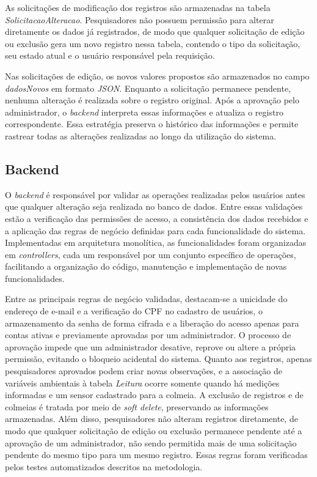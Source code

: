 \documentclass[12pt]{unisenaiclass}
\begin{document}
As solicitações de modificação dos registros são armazenadas na tabela \textit{SolicitacaoAlteracao}. Pesquisadores não possuem permissão para alterar diretamente os dados já registrados, de modo que qualquer solicitação de edição ou exclusão gera um novo registro nessa tabela, contendo o tipo da solicitação, seu estado atual e o usuário responsável pela requisição.

Nas solicitações de edição, os novos valores propostos são armazenados no campo \textit{dadosNovos} em formato \textit{JSON}. Enquanto a solicitação permanece pendente, nenhuma alteração é realizada sobre o registro original. Após a aprovação pelo administrador, o \textit{backend} interpreta essas informações e atualiza o registro correspondente. Essa estratégia preserva o histórico das informações e permite rastrear todas as alterações realizadas ao longo da utilização do sistema.

\subsection{Backend}

O \textit{backend} é responsável por validar as operações realizadas pelos usuários antes que qualquer alteração seja realizada no banco de dados. Entre essas validações estão a verificação das permissões de acesso, a consistência dos dados recebidos e a aplicação das regras de negócio definidas para cada funcionalidade do sistema. Implementadas em arquitetura monolítica, as funcionalidades foram organizadas em \textit{controllers}, cada um responsável por um conjunto específico de operações, facilitando a organização do código, manutenção e implementação de novas funcionalidades.

Entre as principais regras de negócio validadas, destacam-se a unicidade do endereço de e-mail e a verificação do CPF no cadastro de usuários, o armazenamento da senha de forma cifrada e a liberação do acesso apenas para contas ativas e previamente aprovadas por um administrador. 
O processo de aprovação impede que um administrador desative, reprove ou altere a própria permissão, evitando o bloqueio acidental do sistema. Quanto aos registros, apenas pesquisadores aprovados podem criar novas observações, e a associação de variáveis ambientais à tabela \textit{Leitura} ocorre somente quando há medições informadas e um sensor cadastrado para a colmeia. A exclusão de registros e de colmeias é tratada por meio de \textit{soft delete}, preservando as informações armazenadas. Além disso, pesquisadores não alteram registros diretamente, de modo que qualquer solicitação de edição ou exclusão permanece pendente até a aprovação de um administrador, não sendo permitida mais de uma solicitação pendente do mesmo tipo para um mesmo registro. Essas regras foram verificadas pelos testes automatizados descritos na metodologia.
\end{document}
